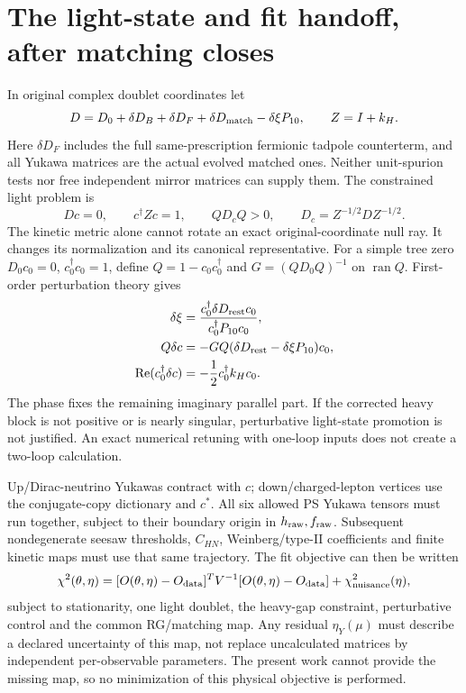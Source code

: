 \documentclass[11pt]{article}
\begin{document}
\section{The light-state and fit handoff, after matching closes}
In original complex doublet coordinates let
\begin{equation}
 D=D_0+\delta D_B+\delta D_F+\delta D_{\rm match}-\delta\xi P_{10},
 \qquad Z=I+k_H.
\end{equation}
Here $\delta D_F$ includes the full same-prescription fermionic tadpole
counterterm, and all Yukawa matrices are the actual evolved matched
ones. Neither unit-spurion tests nor free independent mirror matrices
can supply them. The constrained light problem is
\begin{equation}
 Dc=0,\qquad c^\dagger Zc=1,\qquad
 QD_cQ>0,\qquad D_c=Z^{-1/2}DZ^{-1/2}.
\end{equation}
The kinetic metric alone cannot rotate an exact original-coordinate null
ray. It changes its normalization and its canonical representative. For
a simple tree zero $D_0c_0=0$, $c_0^\dagger c_0=1$, define
$Q=1-c_0c_0^\dagger$ and $G=(QD_0Q)^{-1}$ on $\operatorname{ran}Q$.
First-order perturbation theory gives
\begin{align}
 \delta\xi&=\frac{c_0^\dagger\delta D_{\rm rest}c_0}
                   {c_0^\dagger P_{10}c_0},\\
 Q\delta c&=-GQ(\delta D_{\rm rest}-\delta\xi P_{10})c_0,\\
 \operatorname{Re}(c_0^\dagger\delta c)&=-\frac12c_0^\dagger k_Hc_0.
\end{align}
The phase fixes the remaining imaginary parallel part. If the corrected
heavy block is not positive or is nearly singular, perturbative
light-state promotion is not justified. An exact numerical retuning with
one-loop inputs does not create a two-loop calculation.

Up/Dirac-neutrino Yukawas contract with $c$; down/charged-lepton
vertices use the conjugate-copy dictionary and $c^*$. All six allowed
PS Yukawa tensors must run together, subject to their boundary origin in
$h_{\rm raw},f_{\rm raw}$. Subsequent nondegenerate seesaw thresholds,
$C_{HN}$, Weinberg/type-II coefficients and finite kinetic maps must use
that same trajectory. The fit objective can then be written
\begin{equation}
 \chi^2(\theta,\eta)=
 [O(\theta,\eta)-O_{\rm data}]^T V^{-1}
 [O(\theta,\eta)-O_{\rm data}]+\chi^2_{\rm nuisance}(\eta),
\end{equation}
subject to stationarity, one light doublet, the heavy-gap constraint,
perturbative control and the common RG/matching map. Any residual
$\eta_Y(\mu)$ must describe a declared uncertainty of this map, not
replace uncalculated matrices by independent per-observable parameters.
The present work cannot provide the missing map, so no minimization of
this physical objective is performed.
\end{document}
